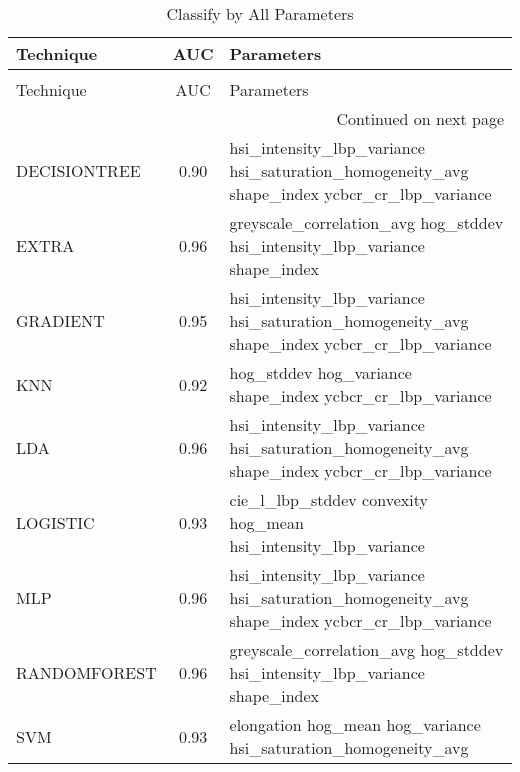 \begin{longtable}{lcl}
\caption[Classify by All Parameters]{Classify by All Parameters}
\label{table:results-all}\\
\toprule
   Technique &  AUC &                                                                                  Parameters \\
\midrule
\endfirsthead
\caption[]{Classify by All Parameters} \\
\toprule
   Technique &  AUC &                                                                                  Parameters \\
\midrule
\endhead
\midrule
\multicolumn{3}{r}{{Continued on next page}} \\
\midrule
\endfoot

\bottomrule
\endlastfoot
DECISIONTREE & 0.90 & hsi\_intensity\_lbp\_variance hsi\_saturation\_homogeneity\_avg shape\_index ycbcr\_cr\_lbp\_variance \\
       EXTRA & 0.96 &                 greyscale\_correlation\_avg hog\_stddev hsi\_intensity\_lbp\_variance shape\_index \\
    GRADIENT & 0.95 & hsi\_intensity\_lbp\_variance hsi\_saturation\_homogeneity\_avg shape\_index ycbcr\_cr\_lbp\_variance \\
         KNN & 0.92 &                                   hog\_stddev hog\_variance shape\_index ycbcr\_cr\_lbp\_variance \\
         LDA & 0.96 & hsi\_intensity\_lbp\_variance hsi\_saturation\_homogeneity\_avg shape\_index ycbcr\_cr\_lbp\_variance \\
    LOGISTIC & 0.93 &                              cie\_l\_lbp\_stddev convexity hog\_mean hsi\_intensity\_lbp\_variance \\
         MLP & 0.96 & hsi\_intensity\_lbp\_variance hsi\_saturation\_homogeneity\_avg shape\_index ycbcr\_cr\_lbp\_variance \\
RANDOMFOREST & 0.96 &                 greyscale\_correlation\_avg hog\_stddev hsi\_intensity\_lbp\_variance shape\_index \\
         SVM & 0.93 &                             elongation hog\_mean hog\_variance hsi\_saturation\_homogeneity\_avg \\
\end{longtable}
